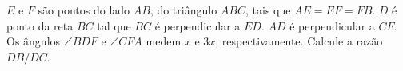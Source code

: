 $E$ e $F$ são pontos do lado $AB$, do triângulo $ABC$, tais que $AE = EF = FB$.
$D$ é ponto da reta $BC$ tal que $BC$ é perpendicular a $ED$.
$AD$ é perpendicular a $CF$. Os ângulos $\angle BDF$ e $\angle CFA$ medem $x$ e $3x$, respectivamente.
Calcule a razão $DB/DC$.